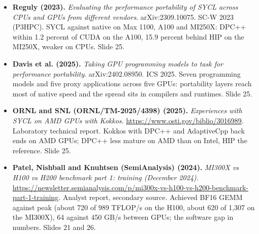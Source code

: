 \begin{itemize}[leftmargin=1.2em,itemsep=3pt]
\item \textbf{Reguly (2023).} \textit{Evaluating the performance portability of SYCL across CPUs and GPUs from different vendors}. arXiv:2309.10075. SC-W 2023 (P3HPC). SYCL against native on Max 1100, A100 and MI250X: DPC++ within 1.2 percent of CUDA on the A100, 15.9 percent behind HIP on the MI250X, weaker on CPUs. Slide 25.
\item \textbf{Davis et al. (2025).} \textit{Taking GPU programming models to task for performance portability}. arXiv:2402.08950. ICS 2025. Seven programming models and five proxy applications across five GPUs: portability layers reach most of native speed and the spread sits in compilers and runtimes. Slide 25.
\item \textbf{ORNL and SNL (ORNL/TM-2025/4398) (2025).} \textit{Experiences with SYCL on AMD GPUs with Kokkos}. \url{https://www.osti.gov/biblio/3016989}. Laboratory technical report. Kokkos with DPC++ and AdaptiveCpp back ends on AMD GPUs; DPC++ less mature on AMD than on Intel, HIP the reference. Slide 25.
\item \textbf{Patel, Nishball and Knuhtsen (SemiAnalysis) (2024).} \textit{MI300X vs H100 vs H200 benchmark part 1: training (December 2024)}. \url{https://newsletter.semianalysis.com/p/mi300x-vs-h100-vs-h200-benchmark-part-1-training}. Analyst report, secondary source. Achieved BF16 GEMM against peak (about 720 of 989 TFLOP/s on the H100, about 620 of 1,307 on the MI300X), 64 against 450 GB/s between GPUs; the software gap in numbers. Slides 21 and 26.
\end{itemize}

